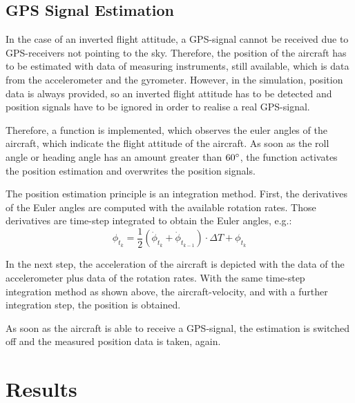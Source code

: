 \documentclass[11pt,a4paper]{scrartcl}		%
\begin{document}
\medskip






\subsection{GPS Signal Estimation}

In the case of an inverted flight attitude, a GPS-signal cannot be received due to GPS-receivers not pointing to the sky.
Therefore, the position of the aircraft has to be estimated with data of measuring instruments, still available, which is data from the accelerometer and the gyrometer.
However, in the simulation, position data is always provided, so an inverted flight attitude has to be detected and position signals have to be ignored in order to realise a real GPS-signal.

\smallskip

Therefore, a function is implemented, which observes the euler angles of the aircraft, which indicate the flight attitude of the aircraft.
As soon as the roll angle or heading angle has an amount greater than $60\degree$, the function activates the position estimation and overwrites the position signals.

\smallskip

The position estimation principle is an integration method.
First, the derivatives of the Euler angles are computed with the available rotation rates. 
Those derivatives are time-step integrated to obtain the Euler angles, e.g.:
\begin{equation}
 \phi_{t_k} = \frac{1}{2}(\dot{\phi}_{t_k}+\dot{\phi}_{t_{k-1}})\cdot \Delta T + \phi_{t_k}
\end{equation}

In the next step, the acceleration of the aircraft is depicted with the data of the accelerometer plus data of the rotation rates.
With the same time-step integration method as shown above, the aircraft-velocity, and with a further integration step, the position is obtained.

\smallskip

As soon as the aircraft is able to receive a GPS-signal, the estimation is switched off and the measured position data is taken, again.


\medskip





\section{Results}\label{ch-Results}
\end{document}

